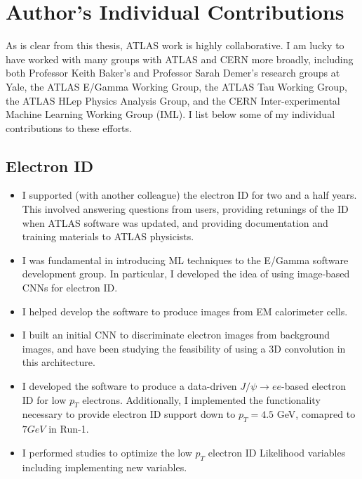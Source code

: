 \chapter{Author's Individual Contributions}
\label{AppendixA}

As is clear from this thesis, ATLAS work is highly collaborative. I am lucky to have worked with many groups with ATLAS and CERN more broadly, including both Professor Keith Baker's and Professor Sarah Demer's research groups at Yale, the ATLAS E/Gamma Working Group, the ATLAS Tau Working Group, the ATLAS HLep Physics Analysis Group, and the CERN Inter-experimental Machine Learning Working Group (IML). I list below some of my individual contributions to these efforts.

\section{Electron ID}
\begin{itemize}
    \item I supported (with another colleague) the electron ID for two and a half years. This involved answering questions from users, providing retunings of the ID when ATLAS software was updated, and providing documentation and training materials to ATLAS physicists.
    \item I was fundamental in introducing ML techniques to the E/Gamma software development group. In particular, I developed the idea of using image-based CNNs for electron ID.
    \item I helped develop the software to produce images from EM calorimeter cells.
    \item I built an initial CNN to discriminate electron images from background images, and have been studying the feasibility of using a 3D convolution in this architecture.
    \item I developed the software to produce a data-driven $J/\psi\rightarrow ee$-based electron ID for low $p_T$ electrons. Additionally, I implemented the functionality necessary to provide electron ID support down to $p_T=4.5$ GeV, comapred to $7 GeV$ in Run-1.
    \item I performed studies to optimize the low $p_T$ electron ID Likelihood variables including implementing new variables.
\end{itemize}

